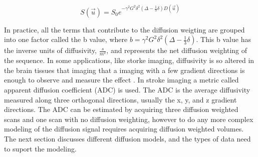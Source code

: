 \begin{equation}
\label{eqn:diffSignal}
S(\vec{u}) = S_0e^{-\gamma^2 G^2 \delta^2(\Delta - \frac{1}{3}\delta) D(\vec{u})}
\end{equation}

In practice, all the terms that contribute to the diffusion weigting are grouped into one factor called the b value, where $b = \gamma^2 G^2 \delta^2(\Delta - \frac{1}{3}\delta)$. This b value has the inverse units of diffusivity, $\frac{s}{m^2}$, and represents the net diffusion weighting of the sequence. In some applications, like storke imaging, diffusivity is so altered in the brain tissues that imaging that a imaging with a few gradient directions is enough to observe and measure the effect \cite{Mukherjee_2000}. In stroke imaging a metric called apparent diffusion coefficient (ADC) is used. The ADC is the average diffusivity measured along three orthogonal directions, usually the x, y, and z gradient directions. The ADC can be estimated by acquiring three diffusion weighted scans and one scan with no diffusion weighting, however to do any more complex modeling of the diffusion signal requires acquiring diffusion weighted volumes. The next section discusses different diffusion models, and the types of data need to suport the modeling.
